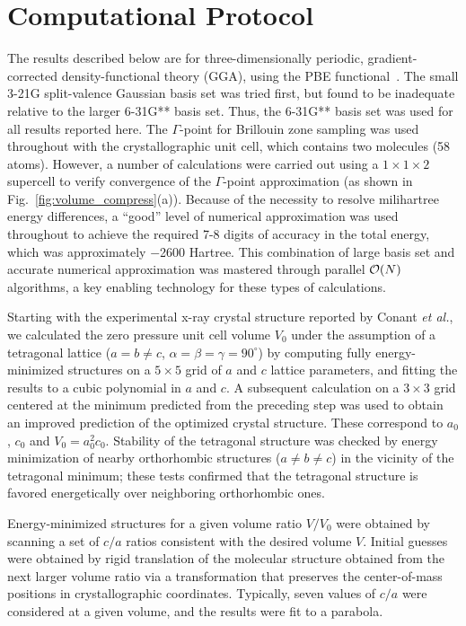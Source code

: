 \documentclass[prb,aps,nobibnotes,superbib,preprint]{revtex4}
\begin{document}
\section{Computational Protocol}
\label{sec:protocol}
The results described below are for three-dimensionally periodic,
gradient-corrected density-functional theory (GGA), using the PBE
functional~\cite{Perdew_96v77}. The small 3-21G split-valence Gaussian 
basis set was tried first, but found to be inadequate relative to the
larger 6-31G** basis set.  Thus, the 6-31G** basis set was used
for all results reported here. The $\Gamma$-point for Brillouin zone sampling was 
used throughout with the crystallographic unit 
cell, which contains two molecules (58 atoms).  However, a number of calculations 
were carried out using a $1 \times 1 \times 2 $ supercell to verify 
convergence of the $\Gamma$-point approximation (as shown in 
Fig.~\ref{fig:volume_compress}(a)).  
Because of the necessity to resolve milihartree energy differences,
a ``good'' level of numerical approximation was used throughout to
achieve the required 7-8 digits of accuracy in the total energy,
which was approximately $-$2600 Hartree.
This combination of large basis set and accurate numerical
approximation was mastered through parallel ${\cal O}(N)$ algorithms, a 
key enabling technology for these types of calculations. 

Starting with the experimental x-ray crystal structure reported by
Conant {\it et al.},~\cite{Conant_1979} we calculated the zero
pressure unit cell volume $V_0$ under the assumption of a tetragonal
lattice ($a=b\neq c$, $\alpha=\beta=\gamma=90^\circ$) by computing
fully energy-minimized structures on a $5\times 5$ grid of $a$ and $c$
lattice parameters, and fitting the results to a cubic polynomial in
$a$ and $c$.  A subsequent calculation on a $3 \times 3$ grid centered
at the minimum predicted from the preceding step was used to obtain an
improved prediction of the optimized crystal structure.  These
correspond to $a_0$, $c_0$ and $V_0=a_0^2c_0$.  Stability of the 
tetragonal structure was checked by energy minimization of nearby
orthorhombic structures ($a\neq b\neq c$) in the vicinity of the tetragonal 
minimum; these tests confirmed that the tetragonal structure is favored 
energetically over neighboring orthorhombic ones.

Energy-minimized structures for a given volume ratio $V/V_0$ were
obtained by scanning a set of $c/a$ ratios consistent with the desired
volume $V$.  Initial guesses were obtained by rigid translation of the
molecular structure obtained from the next larger volume ratio via a
transformation that preserves the center-of-mass positions in
crystallographic coordinates.  Typically, seven values of $c/a$ were
considered at a given volume, and the results were fit to a parabola.
\end{document}
